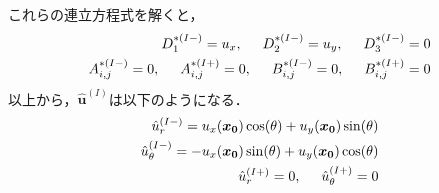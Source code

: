 これらの連立方程式を解くと，
\begin{align}
	D_{1}^{*(I-)}=u_{x},\hspace{0.5cm}D_{2}^{*(I-)}=u_{y},\hspace{0.5cm}D_{3}^{*(I-)}=0
	\nonumber
	\\
	A_{i,j}^{*(I-)}=0,\hspace{0.5cm}A_{i,j}^{*(I+)}=0,\hspace{0.5cm}
	B_{i,j}^{*(I-)}=0,\hspace{0.5cm}B_{i,j}^{*(I+)}=0
\end{align}
以上から，$\hat{\bm{u}}^{(I)}$は以下のようになる．
\begin{align}
	\hat{u}_{r}^{(I-)}=u_{x}(\bm{x_{0}})\cos(\theta)+u_{y}(\bm{x_{0}})\sin(\theta)
	\nonumber
	\\
	\hat{u}_{\theta}^{(I-)}=-u_{x}(\bm{x_{0}})\sin(\theta)+u_{y}(\bm{x_{0}})\cos(\theta)
	\nonumber
	\\
	\hat{u}_{r}^{(I+)}=0,\hspace{0.5cm}\hat{u}_{\theta}^{(I+)}=0
\end{align}

\newpage
